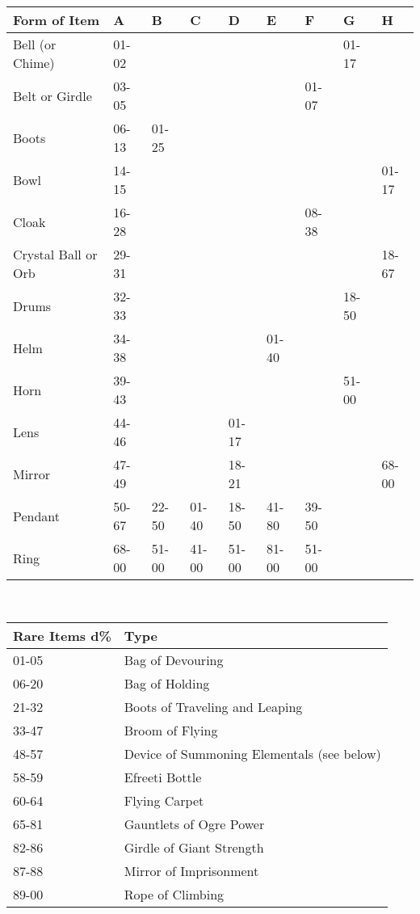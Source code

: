 \documentclass[a4paper,twoside,openany,10pt]{book}
\begin{document}
\begin{tabular*}{1\linewidth}{@{\extracolsep{\fill}}lllllllll}
\textbf{Form of Item} & A & B & C & D & E & F & G & H \\\toprule
Bell (or Chime) & 01-02 & & & & & & 01-17 & \\\hline
Belt or Girdle & 03-05 & & & & & 01-07 & & \\\hline
Boots & 06-13 & 01-25 & & & & & & \\\hline
Bowl & 14-15 & & & & & & & 01-17 \\\hline
Cloak & 16-28 & & & & & 08-38 & & \\\hline
Crystal Ball or Orb & 29-31 & & & & & & & 18-67 \\\hline
Drums & 32-33 & & & & & & 18-50 & \\\hline
Helm & 34-38 & & & & 01-40 & & & \\\hline
Horn & 39-43 & & & & & & 51-00 & \\\hline
Lens & 44-46 & & & 01-17 & & & & \\\hline
Mirror & 47-49 & & & 18-21 & & & & 68-00 \\\hline
Pendant & 50-67 & 22-50 & 01-40 & 18-50 & 41-80 & 39-50 & & \\\hline
Ring & 68-00 & 51-00 & 41-00 & 51-00 & 81-00 & 51-00 & & \\\bottomrule
\end{tabular*}\\\medskip


\label{rare-items}

\begin{tabular*}{1\linewidth}{@{\extracolsep{\fill}}ll}
\textbf{Rare Items} \textbf{d\%} & \textbf{Type} \\\toprule
01-05 & Bag of Devouring \\\hline
06-20 & Bag of Holding \\\hline
21-32 & Boots of Traveling and Leaping \\\hline
33-47 & Broom of Flying \\\hline
48-57 & Device of Summoning Elementals (see below) \\\hline
58-59 & Efreeti Bottle \\\hline
60-64 & Flying Carpet \\\hline
65-81 & Gauntlets of Ogre Power \\\hline
82-86 & Girdle of Giant Strength \\\hline
87-88 & Mirror of Imprisonment \\\hline
89-00 & Rope of Climbing \\\bottomrule
\end{tabular*}
\end{document}
